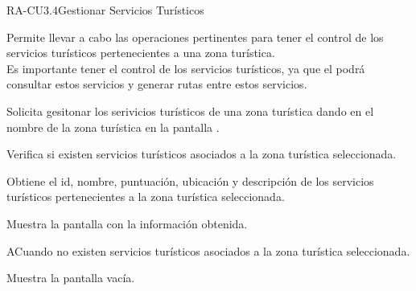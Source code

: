 \begin{UseCase}{RA-CU3.4}{Gestionar Servicios Turísticos}{
		
		Permite llevar a cabo las operaciones pertinentes para tener el control de los servicios turísticos pertenecientes a una zona turística.\\
		
		Es importante tener el control de los servicios turísticos, ya que el  podrá consultar estos servicios y generar rutas entre estos servicios.
	}
	\end{UseCase}
	\begin{UCtrayectoria} 
		\UCpaso [\UCactor] Solicita gesitonar los serivicios turísticos de una zona turística dando en el nombre de la zona turística en la pantalla .
		
		\UCpaso Verifica si existen servicios turísticos asociados a la zona turística seleccionada. 
		
		\UCpaso Obtiene el id, nombre, puntuación, ubicación y descripción de los servicios turísticos pertenecientes a la zona turística seleccionada.
		
		\UCpaso Muestra la pantalla  con la información obtenida.
		
	\end{UCtrayectoria}

	\begin{UCtrayectoriaA}{A}{Cuando no existen servicios turísticos asociados a la zona turística seleccionada.}
		
		\UCpaso Muestra la pantalla  vacía.
		
	\end{UCtrayectoriaA}